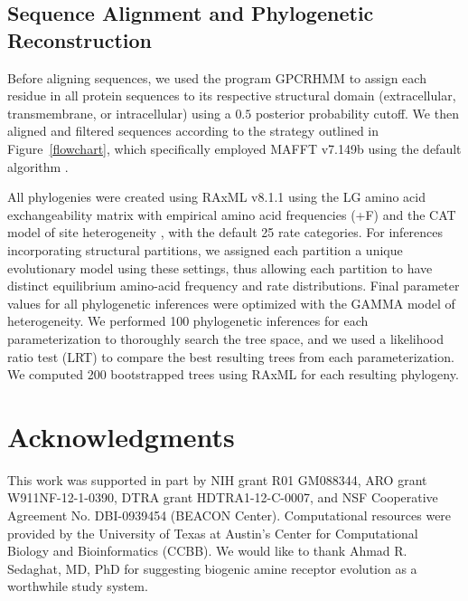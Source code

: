 \documentclass[fleqn,10pt]{wlpeerj}
\begin{document}
\subsection*{Sequence Alignment and Phylogenetic Reconstruction}
Before aligning sequences, we used the program GPCRHMM \citep{Wistrand2006} to assign each residue in all protein sequences to its respective structural domain (extracellular, transmembrane, or intracellular) using a $0.5$ posterior probability cutoff. We then aligned and filtered sequences according to the strategy outlined in Figure~\ref{flowchart}, which specifically employed MAFFT v7.149b using the default algorithm \citep{mafftv7}. 

All phylogenies were created using RAxML v8.1.1 \citep{raxml} using the LG \citep{LG} amino acid exchangeability matrix with empirical amino acid frequencies (+F) and the CAT model of site heterogeneity \citep{Stamatakis2006}, with the default 25 rate categories. For inferences incorporating structural partitions, we assigned each partition a unique evolutionary model using these settings, thus allowing each partition to have distinct equilibrium amino-acid frequency and rate distributions. Final parameter values for all phylogenetic inferences were optimized with the GAMMA model of heterogeneity. We performed 100 phylogenetic inferences for each parameterization to thoroughly search the tree space, and we used a likelihood ratio test (LRT) to compare the best resulting trees from each parameterization. We computed 200 bootstrapped trees using RAxML for each resulting phylogeny.


\section*{Acknowledgments}
This work was supported in part by NIH grant R01 GM088344, ARO grant W911NF-12-1-0390, DTRA grant HDTRA1-12-C-0007, and NSF Cooperative Agreement No. DBI-0939454 (BEACON Center).  Computational resources were provided by the University of Texas at Austin's Center for Computational Biology and Bioinformatics (CCBB). We would like to thank Ahmad R. Sedaghat, MD, PhD for suggesting biogenic amine receptor evolution as a worthwhile study system.

\newpage
\end{document}

